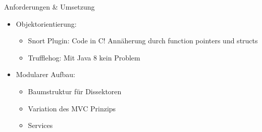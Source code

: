 \begin{frame}{Anforderungen \& Umsetzung}
    \begin{itemize}
        \item Objektorientierung:
        \begin{itemize}
            \item Snort Plugin: Code in C! Annäherung durch function pointers und structs
            \item Trufflehog: Mit Java 8 kein Problem
        \end{itemize}

        \pause
        \item Modularer Aufbau:
        \begin{itemize}
            \item Baumstruktur für Dissektoren
            \item Variation des MVC Prinzips
            \item Services
        \end{itemize}
    \end{itemize}
\end{frame} 
